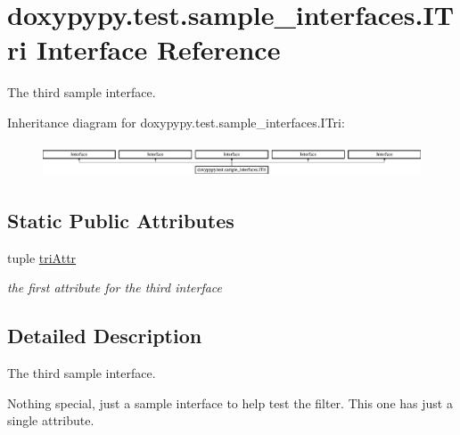 \hypertarget{classdoxypypy_1_1test_1_1sample__interfaces_1_1_i_tri}{\section{doxypypy.\-test.\-sample\-\_\-interfaces.\-I\-Tri Interface Reference}
\label{classdoxypypy_1_1test_1_1sample__interfaces_1_1_i_tri}
}


The third sample interface.  


Inheritance diagram for doxypypy.\-test.\-sample\-\_\-interfaces.\-I\-Tri\-:\begin{figure}[H]
\begin{center}
\leavevmode
\includegraphics[height=0.991150cm]{classdoxypypy_1_1test_1_1sample__interfaces_1_1_i_tri}
\end{center}
\end{figure}
\subsection*{Static Public Attributes}
\begin{DoxyCompactItemize}
\item 
tuple \hyperlink{classdoxypypy_1_1test_1_1sample__interfaces_1_1_i_tri_a1d73109f6b3b33857101f20963cc754b}{tri\-Attr}
\begin{DoxyCompactList}\small\item\em the first attribute for the third interface \end{DoxyCompactList}\end{DoxyCompactItemize}


\subsection{Detailed Description}
The third sample interface. 

Nothing special, just a sample interface to help test the filter. This one has just a single attribute. 

